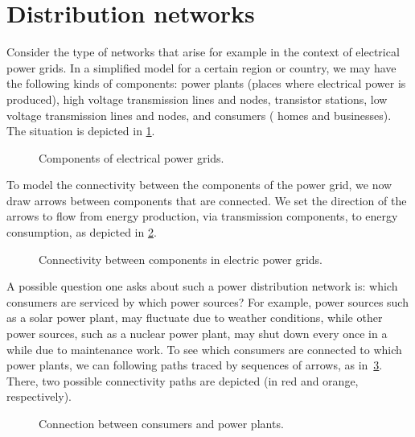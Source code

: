 \section{Distribution networks}\label{sec:connection-distribution-networks}

Consider the type of networks that arise for example in the context of electrical power grids. In a simplified model for a certain region or country, we may have the following kinds of components: power plants (places where electrical power is produced), high voltage transmission lines and nodes, transistor stations, low voltage transmission lines and nodes, and consumers ( homes and businesses). The situation is depicted in \cref{fig:power_nodes}.

\begin{figure}[h!]
    \centering
    \caption{Components of electrical power grids.}
    \label{fig:power_nodes}
\end{figure}
To model the connectivity between the components of the power grid, we now draw arrows between components that are connected. We set the direction of the arrows to flow from energy production, via transmission components, to energy consumption, as depicted in \cref{fig:power_nodes_connected}.
\begin{figure}[h!]
    \centering
    \caption{Connectivity between components in electric power grids.}
    \label{fig:power_nodes_connected}
\end{figure}

A possible question one asks about such a power distribution network is: which consumers are serviced by which power sources? For example, power sources such as a solar power plant, may fluctuate due to weather conditions, while other power sources, such as a nuclear power plant, may shut down every once in a while due to maintenance work. To see which consumers are connected to which power plants, we can following paths traced by sequences of arrows, as in~\cref{fig:power_paths}. There, two possible connectivity paths are depicted (in red and orange, respectively).


\begin{figure}[h!]
    \centering
    \caption{Connection between consumers and power plants.}
    \label{fig:power_paths}
\end{figure}


